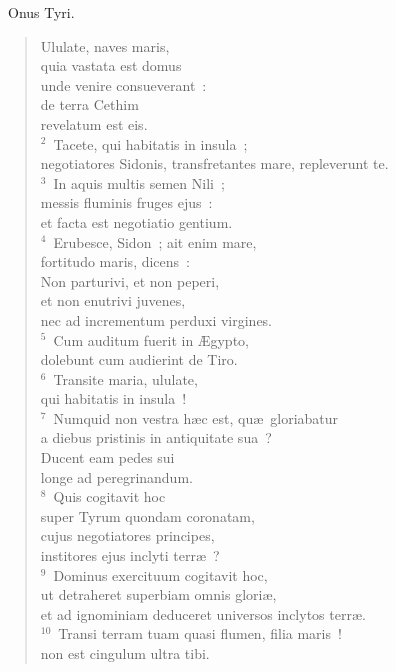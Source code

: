 ~\lettrine[lines=10,image=true,loversize=0.05,lraise=-0.03]{O}{}nus Tyri. \begin{flushleft}\begin{verse}\vspace{6pt}Ululate, naves maris,\\ quia vastata est domus\\ unde venire consueverant~:\\ de terra Cethim\\ revelatum est eis.\\
${}^{2}$~Tacete, qui habitatis in insula~;\\ negotiatores Sidonis, transfretantes mare, repleverunt te.\\
${}^{3}$~In aquis multis semen Nili~;\\ messis fluminis fruges ejus~:\\ et facta est negotiatio gentium.\\
${}^{4}$~Erubesce, Sidon~; ait enim mare,\\ fortitudo maris, dicens~:\\ Non parturivi, et non peperi,\\ et non enutrivi juvenes,\\ nec ad incrementum perduxi virgines.\\
${}^{5}$~Cum auditum fuerit in \AE gypto,\\ dolebunt cum audierint de Tiro.\\
${}^{6}$~Transite maria, ululate,\\ qui habitatis in insula~!\\
${}^{7}$~Numquid non vestra h\ae c est, qu\ae\ gloriabatur\\ a diebus pristinis in antiquitate sua~?\\ Ducent eam pedes sui\\ longe ad peregrinandum.\\
${}^{8}$~Quis cogitavit hoc\\ super Tyrum quondam coronatam,\\ cujus negotiatores principes,\\ institores ejus inclyti terr\ae~?\\
${}^{9}$~Dominus exercituum cogitavit hoc,\\ ut detraheret superbiam omnis glori\ae ,\\ et ad ignominiam deduceret universos inclytos terr\ae .\\
${}^{10}$~Transi terram tuam quasi flumen, filia maris~!\\ non est cingulum ultra tibi.\\

\end{verse}
\end{flushleft}
